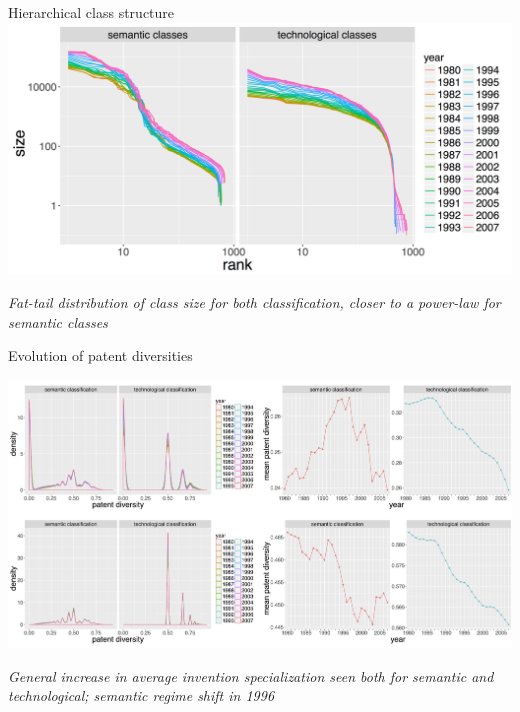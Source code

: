 \documentclass{beamer}
\begin{document}
\begin{frame}{Hierarchical class structure}
   \centering
    \includegraphics[width=\textwidth]{figures/Fig4.png}
    
    \medskip

    \textit{Fat-tail distribution of class size for both classification, closer to a power-law for semantic classes}
    
\end{frame}

\begin{frame}{Evolution of patent diversities}

\label{slide:diversity}
\hyperlink{slide:measures}{}

   \centering
    \includegraphics[width=\textwidth]{figures/Fig5.png}
    
    \medskip

    \textit{General increase in average invention specialization seen both for semantic and technological; semantic regime shift in 1996} 
    
\end{frame}
\end{document}
